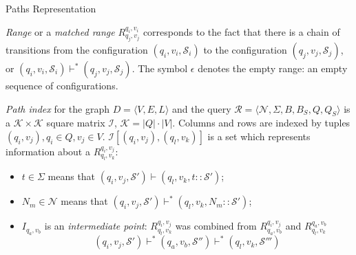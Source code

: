 \documentclass[xcolor=table,aspectratio=169]{beamer}
\begin{document}
\begin{frame}[fragile]{Paths Representation}
  \begin{definition}
    \textit{Range} or a \textit{matched range} $R^{q_i,v_i}_{q_j,v_j}$ corresponds to the fact that there is a chain of transitions from the configuration $(q_i,v_i,\mathcal{S}_i)$ to the configuration $(q_j,v_j,\mathcal{S}_j)$, or $(q_i,v_i,\mathcal{S}_i) \vdash^* (q_j,v_j,\mathcal{S}_j)$. The symbol $\epsilon$ denotes the empty range: an empty sequence of configurations.
  \end{definition}
  \pause
  \begin{definition}
    \textit{Path index} for the graph $D=\langle V,E,L \rangle$ and the query $\mathcal{R}=\langle \mathcal{N}, \Sigma, B, B_S, Q, Q_S \rangle$ is a $\mathcal{K} \times \mathcal{K}$ square matrix $\mathcal{I}$, $\mathcal{K} = |Q|\cdot|V|$.
    Columns and rows are indexed by tuples $(q_i, v_j), q_i \in Q, v_j \in V$. $\mathcal{I}[(q_i,v_j),(q_l,v_k)]$ is a set which represents information about a $R^{q_i,v_j}_{q_l,v_k}$:
\begin{itemize}
    \item $t \in \Sigma$ means that $(q_i,v_j,\mathcal{S}') \vdash (q_l,v_k,t::\mathcal{S}') $; 
    \item $N_m \in \mathcal{N}$ means that $(q_i,v_j,\mathcal{S}') \vdash^* (q_l,v_k,N_m::\mathcal{S}')$; 
    \item $I_{q_a,v_b}$ is an \textit{intermediate point}: $R^{q_i,v_j}_{q_l,v_k}$ was combined from $R^{q_i,v_j}_{q_a,v_b}$ and $R^{q_a,v_b}_{q_l,v_k}$ $$(q_i,v_j,\mathcal{S}') \vdash^* (q_a,v_b,\mathcal{S}'') \vdash^* (q_l,v_k,\mathcal{S}''')$$
\end{itemize}
  \end{definition}
\end{frame}
\end{document}
